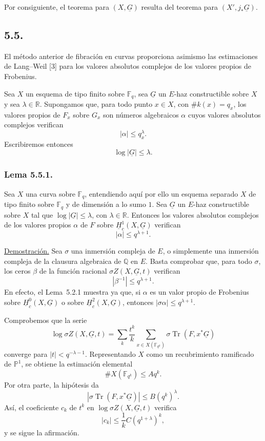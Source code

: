 \pageoriginale

Por consiguiente, el teorema para $(X,\underline G)$ resulta del teorema
para $(X',j_*\underline G)$.

\subsection*{5.5.}
El método anterior de fibración en curvas proporciona asimismo las
estimaciones de Lang--Weil [3] para los valores absolutos complejos de los
valores propios de Frobenius.

Sea $X$ un esquema de tipo finito sobre $\mathbb F_q$, sea $\underline G$
un $E$-haz constructible sobre $X$ y sea $\lambda\in\mathbb R$.
Supongamos que, para todo punto $x\in X$, con
$\#k(x)=q_x$, los valores propios de $F_x$ sobre $G_x$ son números
algebraicos $\alpha$ cuyos valores absolutos complejos verifican
\[
|\alpha|\leq q_x^\lambda.
\]
Escribiremos entonces
\[
\log|\underline G|\leq\lambda.
\]

\subsubsection*{Lema 5.5.1.}
Sea $X$ una curva sobre $\mathbb F_q$, entendiendo aquí por ello un
esquema separado $X$ de tipo finito sobre $\mathbb F_q$ y de dimensión a
lo sumo $1$. Sea $\underline G$ un $E$-haz constructible sobre $X$ tal
que $\log|\underline G|\leq\lambda$, con $\lambda\in\mathbb R$. Entonces
los valores absolutos complejos de los valores propios $\alpha$ de $F$
sobre $\underline H_c^1(X,\underline G)$ verifican
\[
|\alpha|\leq q^{\lambda+1}.
\]

\pageoriginale

\noindent\underline{Demostración.}
Sea $\sigma$ una inmersión compleja de $E$, o simplemente una inmersión
compleja de la clausura algebraica de $\mathbb Q$ en $E$. Basta comprobar
que, para todo $\sigma$, los ceros $\beta$ de la función racional
$\sigma Z(X,\underline G,t)$ verifican
\[
|\beta^{-1}|\leq q^{\lambda+1}.
\]
En efecto, el Lema~5.2.1 muestra ya que, si $\alpha$ es un valor propio de
Frobenius sobre $\underline H_c^0(X,\underline G)$ o sobre
$\underline H_c^2(X,\underline G)$, entonces
$|\sigma\alpha|\leq q^{\lambda+1}$.

Comprobemos que la serie
\[
\log\sigma Z(X,\underline G,t)
=\sum_k\frac{t^k}{k}
\sum_{x\in X(\mathbb F_{q^k})}
\sigma\operatorname{Tr}(F,x^*\underline G)
\]
converge para $|t|<q^{-\lambda-1}$. Representando $X$ como un
recubrimiento ramificado de $\mathbb P^1$, se obtiene la estimación
elemental
\[
\#X(\mathbb F_{q^k})\leq Aq^k.
\]
Por otra parte, la hipótesis da
\[
\left|\sigma\operatorname{Tr}(F,x^*\underline G)\right|
\leq B(q^k)^\lambda.
\]
Así, el coeficiente $c_k$ de $t^k$ en
$\log\sigma Z(X,\underline G,t)$ verifica
\[
|c_k|\leq\frac1k C(q^{1+\lambda})^k,
\]
y se sigue la afirmación.

